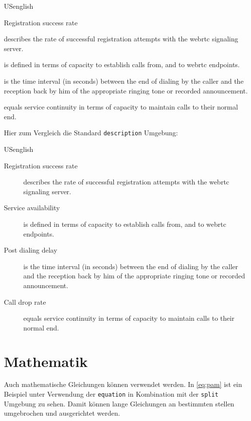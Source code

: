 \begin{otherlanguage*}{USenglish} %
\begin{labeling}{Registration success rate}
	\item[Registration success rate] describes the rate of successful registration attempts with the \ac{webrtc} signaling server.
	\item[Service availability] is defined in terms of capacity to establish calls from, and to \ac{webrtc} endpoints. 
	\item[Post dialing delay] is the time interval (in seconds) between the end of dialing by the caller and the reception back by him of the appropriate ringing tone or recorded announcement.
	\item[Call drop rate] equals service continuity in terms of capacity to maintain calls to their normal end.
\end{labeling}
\end{otherlanguage*}

Hier zum Vergleich die Standard \texttt{description} Umgebung:

\begin{otherlanguage*}{USenglish} %
\begin{description}
	\item[Registration success rate] describes the rate of successful registration attempts with the \ac{webrtc} signaling server.
	\item[Service availability] is defined in terms of capacity to establish calls from, and to \ac{webrtc} endpoints. 
	\item[Post dialing delay] is the time interval (in seconds) between the end of dialing by the caller and the reception back by him of the appropriate ringing tone or recorded announcement.
	\item[Call drop rate] equals service continuity in terms of capacity to maintain calls to their normal end.
\end{description}
\end{otherlanguage*}

\section{Mathematik}
Auch mathematische Gleichungen können verwendet werden. In \autoref{eq:pam} ist ein Beispiel unter Verwendung der \texttt{equation} in Kombination mit der \texttt{split} Umgebung zu sehen. Damit können lange Gleichungen an bestimmten stellen umgebrochen und ausgerichtet werden.

